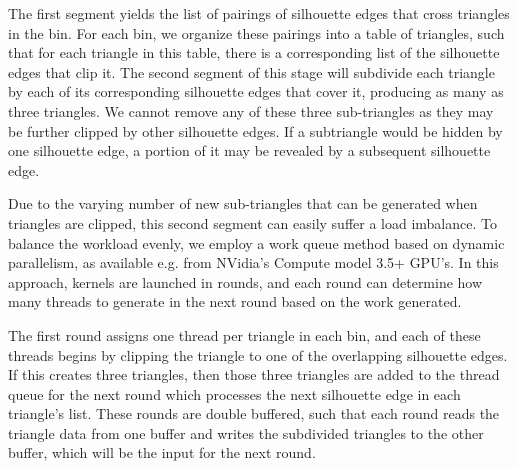 \documentclass[review]{acmsiggraph}
\begin{document}
The first segment yields the list of pairings of silhouette edges that cross
triangles in the bin. For each bin, we organize these pairings into a table of
triangles, such that for each triangle in this table, there is a corresponding
list of the silhouette edges that clip it. The second segment of this stage
will subdivide each triangle by each of its corresponding silhouette edges
that cover it, producing as many as three triangles. We cannot remove any of
these three sub-triangles as they may be further clipped by other silhouette
edges.  If a subtriangle would be hidden by one silhouette edge, a
portion of it may be revealed by a subsequent silhouette edge.



Due to the varying number of new sub-triangles that can be generated when
triangles are clipped, this second segment can easily suffer a load imbalance.
To balance the workload evenly, we employ a work queue method based on dynamic
parallelism, as available e.g. from NVidia's Compute model 3.5+ GPU's. In this
approach, kernels are launched in rounds, and each round can determine how many
threads to generate in the next round based on the work generated.

The first round assigns one thread per triangle in each bin, and each of these
threads begins by clipping the triangle to one of the overlapping silhouette
edges. If this creates three triangles, then those three triangles are added to
the thread queue for the next round which processes the next silhouette edge
in each triangle's list. These rounds are double buffered, such that each
round reads the triangle data from one buffer and writes the subdivided
triangles to the other buffer, which will be the input for the next round.
\end{document}
